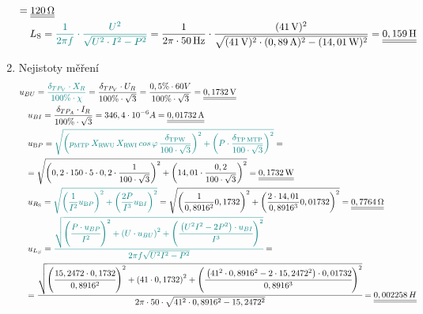 \documentclass[a4paper, czech]{article}
\begin{document}
\begin{enumerate}
\begin{multline*}
        = \underline{\underline{120\,\Omega}} \hfill \\
        \ \ \ L_\text{S} = \textcolor{teal}{\frac{1}{2 \pi f} \cdot \frac{U^2}{\sqrt{U^2 \cdot I^2 - P^2}}}
        = \frac{1}{2 \pi \cdot 50\,\text{Hz}} \cdot \frac{(41\,\text{V})^2}{\sqrt{(41\,\text{V})^2 \cdot (0,89\,\text{A})^2 - (14,01\,\text{W})^2}} = 
        \underline{\underline{0,159\,\text{H}}} \hfill
    \end{multline*}
    \item Nejistoty měření
    \begin{multline*}
        u_{BU} = \textcolor{teal}{\frac{\delta_{TP_V} \cdot X_R}{100 \% \cdot \chi}} = \frac{\delta_{TP_V} \cdot U_R}{100 \% \cdot \sqrt{3}} = \frac{0,5\% \cdot 60V}{100 \% \cdot \sqrt{3}} = \underline{\underline{0,1732\,\text{V}}} \hfill \\
        \ \ \ u_{BI} = \frac{\delta_{TP_A} \cdot I_R}{100 \% \cdot \sqrt{3}} = 346,4 \cdot 10^{-6} A = \underline{\underline{0,01732\,\text{A}}} \hfill \\
        \ \ \ u_{\text{B}P} = \textcolor{teal}{\sqrt{\left(p_\text{MTP}\,X_\text{RWU}\,X_\text{RWI}\,cos\,\varphi\,\frac{\delta_\text{TPW}}{100 \cdot \sqrt{3}}\right)^2 + \left(P \cdot \frac{\delta_\text{TP\,MTP}}{100 \cdot \sqrt{3}}\right)^2}} = \hfill \\
        \ \ \ = \sqrt{\left(0,2 \cdot 150 \cdot 5 \cdot 0,2 \cdot \frac{1}{100 \cdot \sqrt{3}}\right)^2 + \left(14,01 \cdot \frac{0,2}{100 \cdot \sqrt{3}}\right)^2} = \underline{\underline{0,1732\,\text{W}}} \hfill \\
        \ \ \ u_{R_\text{S}} = \textcolor{teal}{\sqrt{\left(\frac{1}{I^2} u_{\text{B}P}\right)^2 + \left(\frac{2P}{I^3}u_{\text{B}I}\right)^2}} = \sqrt{\left(\frac{1}{0,8916^2} 0,1732\right)^2 + \left(\frac{2 \cdot 14,01}{0,8916^3}0,01732\right)^2} = \underline{\underline{0,7764\,\Omega}} \hfill \\
        \ \ \ u_{L_S} = \textcolor{teal}{\cfrac{\sqrt{\left(\cfrac{P \cdot u_{BP}}{I^2}\right)^2 + \left(U \cdot u_{BU}\right)^2 + \left(\cfrac{\left(U^2I^2 - 2 P^2\right) \cdot u_{BI}}{I^3}\right)^2}}{2 \pi f \sqrt{U^2I^2-P^2}}} =  \hfill \\
        \ \ \ = \cfrac{\sqrt{\left(\cfrac{15,2472 \cdot 0,1732}{0,8916^2}\right)^2 + \left(41 \cdot 0,1732\right)^2 + \left(\cfrac{\left(41^2 \cdot 0,8916^2 - 2 \cdot 15,2472^2\right) \cdot 0,01732}{0,8916^3}\right)^2}}{2 \pi \cdot 50 \cdot \sqrt{41^2 \cdot 0,8916^2 - 15,2472^2}} = \underline{\underline{0,002258\,H}} \hfill \\

\end{multline*}
\end{enumerate}
\end{document}
